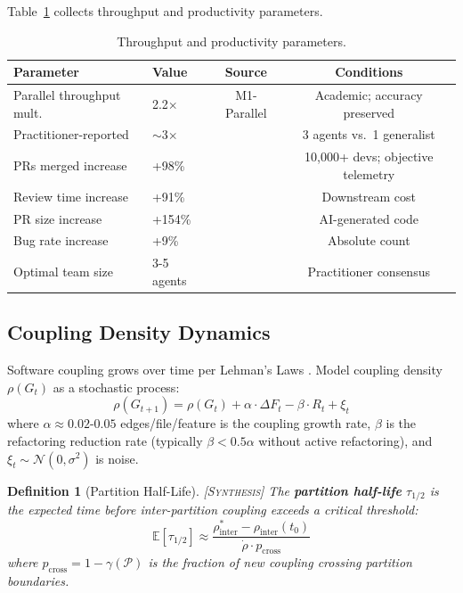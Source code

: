 \documentclass[11pt, a4paper, copyright]{googledeepmind}
\newtheorem{definition}{Definition}[section]
\newcommand{\synthesis}{\textsc{[Synthesis]}}
\begin{document}
Table~\ref{tab:throughput-params} collects throughput and productivity parameters.

\begin{table}[ht]
\centering
\caption{Throughput and productivity parameters.}
\label{tab:throughput-params}
\small
\begin{tabular}{llcc}
\toprule
\textbf{Parameter} & \textbf{Value} & \textbf{Source} & \textbf{Conditions} \\
\midrule
Parallel throughput mult. & 2.2$\times$ & M1-Parallel & Academic; accuracy preserved \\
Practitioner-reported & $\sim$3$\times$ & \citet{Osmani2025} & 3 agents vs.\ 1 generalist \\
PRs merged increase & +98\% & \citet{DORA2025} & 10,000+ devs; objective telemetry \\
Review time increase & +91\% & \citet{DORA2025} & Downstream cost \\
PR size increase & +154\% & \citet{DORA2025} & AI-generated code \\
Bug rate increase & +9\% & \citet{DORA2025} & Absolute count \\
Optimal team size & 3-5 agents & \citet{Osmani2025} & Practitioner consensus \\
\bottomrule
\end{tabular}
\end{table}

\subsection{Coupling Density Dynamics}

Software coupling grows over time per Lehman's Laws \citep{Lehman1980}.
Model coupling density $\rho(G_t)$ as a stochastic process:
\begin{equation}
  \rho(G_{t+1}) = \rho(G_t) + \alpha \cdot \Delta F_t - \beta \cdot R_t + \xi_t
\end{equation}
where $\alpha \approx 0.02$-$0.05$ edges/file/feature is the coupling growth rate, $\beta$ is the refactoring reduction rate (typically $\beta < 0.5\alpha$ without active refactoring), and $\xi_t \sim \mathcal{N}(0, \sigma^2)$ is noise.

\begin{definition}[Partition Half-Life] \synthesis{}
The \textbf{partition half-life} $\tau_{1/2}$ is the expected time before inter-partition coupling exceeds a critical threshold:
\begin{equation}
  \mathbb{E}[\tau_{1/2}] \approx \frac{\rho_{\mathrm{inter}}^* - \rho_{\mathrm{inter}}(t_0)}{\dot{\rho} \cdot p_{\mathrm{cross}}}
\end{equation}
where $p_{\mathrm{cross}} = 1 - \gamma(\mathcal{P})$ is the fraction of new coupling crossing partition boundaries.
\end{definition}
\end{document}
